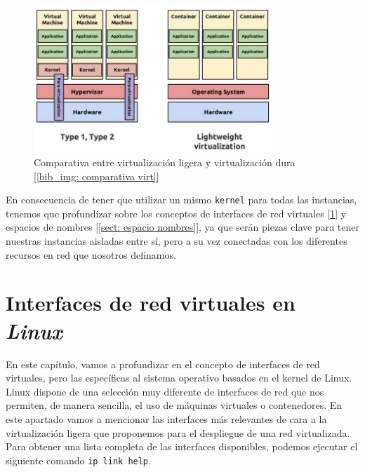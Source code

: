 \documentclass[12pt]{article}
\begin{document}
	\begin{figure}[h!]
		\begin{center}
			\includegraphics[width=0.8\textwidth]{img/virtualization_comparative.png}
			\caption{Comparativa entre virtualización ligera y virtualización dura [\ref{bib_img: comparativa virt}] }
			\label{img: virtualization comparative}
		\end{center}
	\end{figure}
	
	\noindent En consecuencia de tener que utilizar un mismo \texttt{kernel} para todas las instancias, tenemos que profundizar sobre los conceptos de interfaces de red virtuales [\ref{sect: interfaces virtuales}] y espacios de nombres [\ref{sect: espacio nombres}], ya que serán piezas clave para tener nuestras instancias aisladas entre sí, pero a su vez conectadas con los diferentes recursos en red que nosotros definamos.
	
	\pagebreak
	
	\section{Interfaces de red virtuales en \textit{Linux}}
	\label{sect: interfaces virtuales}
	\noindent En este capítulo, vamos a profundizar en el concepto de interfaces de red virtuales, pero las específicas al sistema operativo basados en el kernel de Linux. \\
	
	\noindent Linux dispone de una selección muy diferente de interfaces de red que nos permiten, de manera sencilla, el uso de máquinas virtuales o contenedores. En este apartado vamos a mencionar las interfaces más relevantes de cara a la virtualización ligera que proponemos para el despliegue de una red virtualizada. Para obtener una lista completa de las interfaces disponibles, podemos ejecutar el siguiente comando \texttt{ip link help}.\\
	
\end{document}
